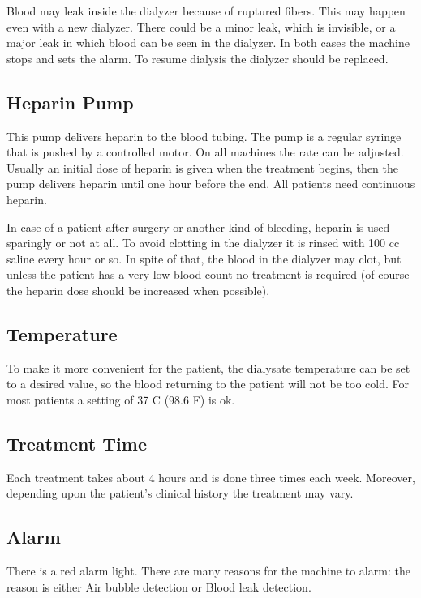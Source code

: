\documentclass[
  11pt,
  letterpaper,
  DIV=11,
  numbers=noendperiod]{scrreprt}
\begin{document}
Blood may leak inside the dialyzer because of ruptured fibers. This may
happen even with a new dialyzer. There could be a minor leak, which is
invisible, or a major leak in which blood can be seen in the dialyzer.
In both cases the machine stops and sets the alarm. To resume dialysis
the dialyzer should be replaced.

\subsection{Heparin Pump}\label{heparin-pump}

This pump delivers heparin to the blood tubing. The pump is a regular
syringe that is pushed by a controlled motor. On all machines the rate
can be adjusted. Usually an initial dose of heparin is given when the
treatment begins, then the pump delivers heparin until one hour before
the end. All patients need continuous heparin.

In case of a patient after surgery or another kind of bleeding, heparin
is used sparingly or not at all. To avoid clotting in the dialyzer it is
rinsed with 100 cc saline every hour or so. In spite of that, the blood
in the dialyzer may clot, but unless the patient has a very low blood
count no treatment is required (of course the heparin dose should be
increased when possible).

\subsection{Temperature}\label{temperature}

To make it more convenient for the patient, the dialysate temperature
can be set to a desired value, so the blood returning to the patient
will not be too cold. For most patients a setting of 37 C (98.6 F) is
ok.

\subsection{Treatment Time}\label{treatment-time}

Each treatment takes about 4 hours and is done three times each week.
Moreover, depending upon the patient's clinical history the treatment
may vary.

\subsection{Alarm}\label{alarm}

There is a red alarm light. There are many reasons for the machine to
alarm: the reason is either Air bubble detection or Blood leak
detection.
\end{document}

